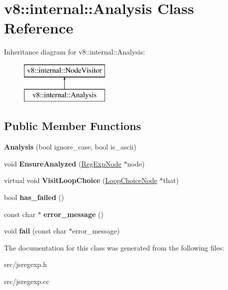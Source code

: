 \hypertarget{classv8_1_1internal_1_1_analysis}{}\section{v8\+:\+:internal\+:\+:Analysis Class Reference}
\label{classv8_1_1internal_1_1_analysis}
Inheritance diagram for v8\+:\+:internal\+:\+:Analysis\+:\begin{figure}[H]
\begin{center}
\leavevmode
\includegraphics[height=2.000000cm]{classv8_1_1internal_1_1_analysis}
\end{center}
\end{figure}
\subsection*{Public Member Functions}
\begin{DoxyCompactItemize}
\item 
\hypertarget{classv8_1_1internal_1_1_analysis_a90d7b97c1fa821b017667f542031f9ae}{}{\bfseries Analysis} (bool ignore\+\_\+case, bool is\+\_\+ascii)\label{classv8_1_1internal_1_1_analysis_a90d7b97c1fa821b017667f542031f9ae}

\item 
\hypertarget{classv8_1_1internal_1_1_analysis_a91ea9ab34a0b720e4ba0414997e6f978}{}void {\bfseries Ensure\+Analyzed} (\hyperlink{classv8_1_1internal_1_1_reg_exp_node}{Reg\+Exp\+Node} $\ast$node)\label{classv8_1_1internal_1_1_analysis_a91ea9ab34a0b720e4ba0414997e6f978}

\item 
\hypertarget{classv8_1_1internal_1_1_analysis_aa6a0b113e9b8a9268a3af41dbdc24ff6}{}virtual void {\bfseries Visit\+Loop\+Choice} (\hyperlink{classv8_1_1internal_1_1_loop_choice_node}{Loop\+Choice\+Node} $\ast$that)\label{classv8_1_1internal_1_1_analysis_aa6a0b113e9b8a9268a3af41dbdc24ff6}

\item 
\hypertarget{classv8_1_1internal_1_1_analysis_a49fb801db5532a96bc0c078e3c928910}{}bool {\bfseries has\+\_\+failed} ()\label{classv8_1_1internal_1_1_analysis_a49fb801db5532a96bc0c078e3c928910}

\item 
\hypertarget{classv8_1_1internal_1_1_analysis_a70729ef89c68f6ba50909873d438fe47}{}const char $\ast$ {\bfseries error\+\_\+message} ()\label{classv8_1_1internal_1_1_analysis_a70729ef89c68f6ba50909873d438fe47}

\item 
\hypertarget{classv8_1_1internal_1_1_analysis_ae430a167d7e2e6cf98834465c537a64e}{}void {\bfseries fail} (const char $\ast$error\+\_\+message)\label{classv8_1_1internal_1_1_analysis_ae430a167d7e2e6cf98834465c537a64e}

\end{DoxyCompactItemize}


The documentation for this class was generated from the following files\+:\begin{DoxyCompactItemize}
\item 
src/jsregexp.\+h\item 
src/jsregexp.\+cc\end{DoxyCompactItemize}
